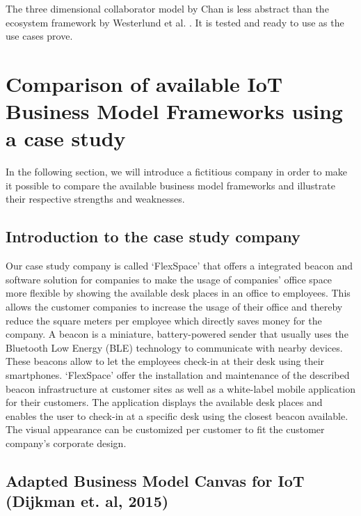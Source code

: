 		The three dimensional collaborator model by Chan is less abstract than the ecosystem framework by Westerlund et al. \cite{westerlund}. It is tested and ready to use as the use cases prove.

\section{Comparison of available IoT Business Model Frameworks using a case study}
\label{sec:bmf_comparison}
	In the following section, we will introduce a fictitious company in order to make it possible to compare the available business model frameworks and illustrate their respective strengths and weaknesses.

	

	\subsection{Introduction to the case study company}
		Our case study company is called `FlexSpace' that offers a integrated beacon and software solution for companies to make the usage of companies' office space more flexible by showing the available desk places in an office to employees. This allows the customer companies to increase the usage of their office and thereby reduce the square meters per employee which directly saves money for the company. A beacon is a miniature, battery-powered sender that usually uses the Bluetooth Low Energy (BLE) technology to communicate with nearby devices. These beacons allow to let the employees check-in at their desk using their smartphones. `FlexSpace' offer the installation and maintenance of the described beacon infrastructure at customer sites as well as a white-label mobile application for their customers. The application displays the available desk places and enables the user to check-in at a specific desk using the closest beacon available. The visual appearance can be customized per customer to fit the customer company's corporate design.


	\subsection{Adapted Business Model Canvas for IoT (Dijkman et. al, 2015)}

